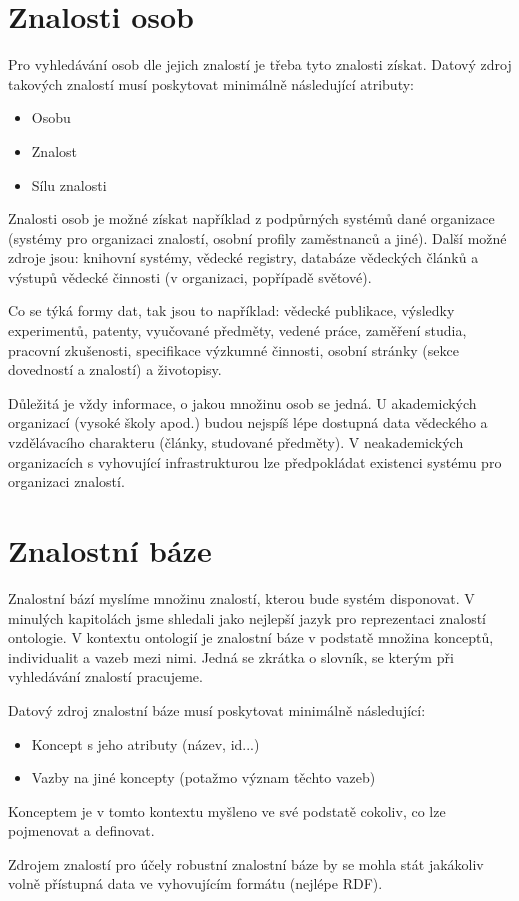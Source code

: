 \section{Znalosti osob}
Pro vyhledávání osob dle jejich znalostí je třeba tyto znalosti získat. Datový zdroj takových znalostí musí poskytovat minimálně následující atributy:
\begin{itemize}
    \item Osobu
    \item Znalost %
    \item Sílu znalosti
\end{itemize}
Znalosti osob je možné získat například z podpůrných systémů dané organizace (systémy pro organizaci znalostí, osobní profily zaměstnanců a jiné). Další možné zdroje jsou: knihovní systémy, vědecké registry, databáze vědeckých článků a výstupů vědecké činnosti (v organizaci, popřípadě světové).\par
Co se týká formy dat, tak jsou to například: vědecké publikace, výsledky experimentů, patenty, vyučované předměty, vedené práce, zaměření studia, pracovní zkušenosti, specifikace výzkumné činnosti, osobní stránky (sekce dovedností a znalostí) a životopisy.\par
Důležitá je vždy informace, o jakou množinu osob se jedná. U akademických organizací (vysoké školy apod.) budou nejspíš lépe dostupná data vědeckého a vzdělávacího charakteru (články, studované předměty). V neakademických organizacích s vyhovující infrastrukturou lze předpokládat existenci systému pro organizaci znalostí.\par
\section{Znalostní báze} 
Znalostní bází myslíme množinu znalostí, kterou bude systém disponovat. V minulých kapitolách jsme shledali jako nejlepší jazyk pro reprezentaci znalostí ontologie. V kontextu ontologií je znalostní báze v podstatě množina konceptů, individualit a vazeb mezi nimi. Jedná se zkrátka o slovník, se kterým při vyhledávání znalostí pracujeme. \par
\noindent Datový zdroj znalostní báze musí poskytovat minimálně následující:
\begin{itemize}
    \item Koncept s jeho atributy (název, id...)
    \item Vazby na jiné koncepty (potažmo význam těchto vazeb)
\end{itemize}
Konceptem je v tomto kontextu myšleno ve své podstatě cokoliv, co lze pojmenovat a definovat.\par
\noindent Zdrojem znalostí pro účely robustní znalostní báze by se mohla stát jakákoliv volně přístupná data ve vyhovujícím formátu (nejlépe RDF).\par
